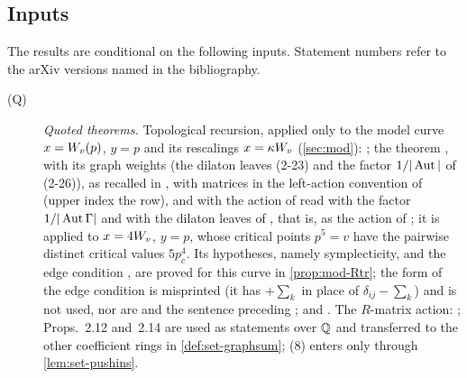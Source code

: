 
\subsection{Inputs}
\label{sec:int-inputs}

The results are conditional on the following inputs. Statement numbers refer to the arXiv versions named in the bibliography.
\begin{description}
\item[(Q)] \emph{Quoted theorems.} Topological recursion, applied only to the model curve $x=W_{v}(p)$, $y=p$ and its rescalings $x=\kappa W_{v}$ (\cref{sec:mod}): \cite[Def.~4.2, (4-9), with the kernel (4-3); Theorems~4.2 and~4.6; Theorem~5.1, (5-14), with \S5.3, (5-27)--(5-30)]{Eynard:2007kz}; the theorem \cite[Theorem~4.1, with (4-1)--(4-3)]{DuninBarkowski:2012bw}, with its graph weights \cite[\S2.3, (2-22)--(2-26)]{DuninBarkowski:2012bw} (the dilaton leaves (2-23) and the factor $1/|\operatorname{Aut}|$ of (2-26)), as recalled in \cite[\S2.6, (2-30)--(2-32), (2-34), (2-35)]{Dunin-Barkowski:2015caa}, with matrices in the left-action convention of \cite[Remark~2.1]{Dunin-Barkowski:2015caa} (upper index the row), and with the action of \cite[\S2.3]{Dunin-Barkowski:2015caa} read with the factor $1/|\operatorname{Aut}\Gamma|$ and with the dilaton leaves of \cite[Def.~2.13]{PPZ15}, that is, as the action of \cite[Defs.~2.2, 2.13]{PPZ15}; it is applied to $x=4W_{v}$, $y=p$, whose critical points $p^5=v$ have the pairwise distinct critical values $5p_c^4$. Its hypotheses, namely symplecticity, \cite[(2-32)]{Dunin-Barkowski:2015caa} and the edge condition \cite[(4-1)]{DuninBarkowski:2012bw}, are proved for this curve in \cref{prop:mod-Rtr}; the form \cite[(2-33)]{Dunin-Barkowski:2015caa} of the edge condition is misprinted (it has $+\sum_k$ in place of $\delta_{ij}-\sum_k$) and is not used, nor are \cite[Prop.~4.3]{Dunin-Barkowski:2015caa} and the sentence preceding \cite[Theorem~8.1]{Dunin-Barkowski:2015caa}; and \cite[Theorem~7.1: (7.6), (7.7) with its factor $1/\hbar^2$, (7.9), (7.10), with the kernel (1.1) and the assumptions of \S1.1]{ABDKS25}. The $R$-matrix action: \cite[\S0.2, (1); Def.~0.3, in particular (iii); (5); Remark~2.1 and (6); Def.~2.2, with the convention stated after it (p.~20); Def.~2.5, with the convention stated after it; Prop.~2.12, with the formula (8) in its proof; Def.~2.13; Prop.~2.14]{PPZ15}; Props.~2.12 and~2.14 are used as statements over $\mathbb{Q}$ and transferred to the other coefficient rings in \cref{def:set-graphsum}; (8) enters only through \cref{lem:set-pushins}.

\end{description}
